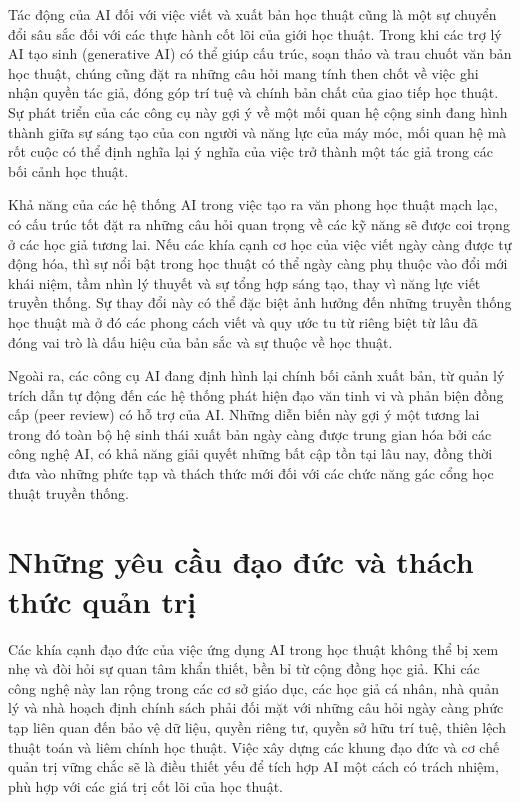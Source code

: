 Tác động của AI đối với việc viết và xuất bản học thuật cũng là một sự chuyển đổi sâu sắc đối với các thực hành cốt lõi của giới học thuật. Trong khi các trợ lý AI tạo sinh (generative AI) có thể giúp cấu trúc, soạn thảo và trau chuốt văn bản học thuật, chúng cũng đặt ra những câu hỏi mang tính then chốt về việc ghi nhận quyền tác giả, đóng góp trí tuệ và chính bản chất của giao tiếp học thuật. Sự phát triển của các công cụ này gợi ý về một mối quan hệ cộng sinh đang hình thành giữa sự sáng tạo của con người và năng lực của máy móc, mối quan hệ mà rốt cuộc có thể định nghĩa lại ý nghĩa của việc trở thành một tác giả trong các bối cảnh học thuật.

Khả năng của các hệ thống AI trong việc tạo ra văn phong học thuật mạch lạc, có cấu trúc tốt đặt ra những câu hỏi quan trọng về các kỹ năng sẽ được coi trọng ở các học giả tương lai. Nếu các khía cạnh cơ học của việc viết ngày càng được tự động hóa, thì sự nổi bật trong học thuật có thể ngày càng phụ thuộc vào đổi mới khái niệm, tầm nhìn lý thuyết và sự tổng hợp sáng tạo, thay vì năng lực viết truyền thống. Sự thay đổi này có thể đặc biệt ảnh hưởng đến những truyền thống học thuật mà ở đó các phong cách viết và quy ước tu từ riêng biệt từ lâu đã đóng vai trò là dấu hiệu của bản sắc và sự thuộc về học thuật.

Ngoài ra, các công cụ AI đang định hình lại chính bối cảnh xuất bản, từ quản lý trích dẫn tự động đến các hệ thống phát hiện đạo văn tinh vi và phản biện đồng cấp (peer review) có hỗ trợ của AI. Những diễn biến này gợi ý một tương lai trong đó toàn bộ hệ sinh thái xuất bản ngày càng được trung gian hóa bởi các công nghệ AI, có khả năng giải quyết những bất cập tồn tại lâu nay, đồng thời đưa vào những phức tạp và thách thức mới đối với các chức năng gác cổng học thuật truyền thống.

\section{Những yêu cầu đạo đức và thách thức quản trị}

Các khía cạnh đạo đức của việc ứng dụng AI trong học thuật không thể bị xem nhẹ và đòi hỏi sự quan tâm khẩn thiết, bền bỉ từ cộng đồng học giả. Khi các công nghệ này lan rộng trong các cơ sở giáo dục, các học giả cá nhân, nhà quản lý và nhà hoạch định chính sách phải đối mặt với những câu hỏi ngày càng phức tạp liên quan đến bảo vệ dữ liệu, quyền riêng tư, quyền sở hữu trí tuệ, thiên lệch thuật toán và liêm chính học thuật. Việc xây dựng các khung đạo đức và cơ chế quản trị vững chắc sẽ là điều thiết yếu để tích hợp AI một cách có trách nhiệm, phù hợp với các giá trị cốt lõi của học thuật.

